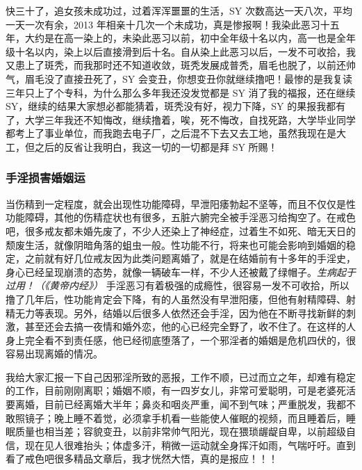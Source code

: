 \begin{case}[手淫损害爱情运]
    快三十了，追女孩未成功过，过着浑浑噩噩的生活，SY 次数高达一天八次，平均一天一次有余，2013 年相亲十几次一个未成功，真是惨报啊！我染此恶习十五年，大约是在高一染上的，未染此恶习以前，初中全年级十名以内，高一也是全年级十名以内，染上以后直接滑到后十名。自从染上此恶习以后，一发不可收拾，我又患上了斑秃，而我那时还不知道收敛，斑秃发展成普秃，眉毛也脱了，以前还帅气，眉毛没了直接丑死了，SY 会变丑，你想变丑你就继续撸吧！最惨的是我复读三年只上了个专科，为什么那么多年我还没发觉都是 SY 消了我的福报，还在继续 SY，继续的结果大家想必都能猜着，斑秃没有好，视力下降，SY 的果报我都有了，大学三年我还不知悔改，继续撸着，唉，死不悔改，自找死路，大学毕业同学都考上了事业单位，而我跑去电子厂，之后混不下去又去工地，虽然我现在是大工，但之后的反省让我明白，我这一切的一切都是拜 SY 所赐！
\end{case}

\subsubsection{手淫损害婚姻运}

当伤精到一定程度，就会出现性功能障碍，早泄阳痿勃起不坚等，而且不仅仅是性功能障碍，其他的伤精症状也有很多，五脏六腑完全被手淫恶习给掏空了。在戒色吧，很多戒友都未婚先废了，不少人还染上了神经症，过着生不如死、暗无天日的颓废生活，就像阴暗角落的蛆虫一般。性功能不行，将来也可能会影响到婚姻的稳定，之前就有好几位戒友因为此类问题离婚了，就是在结婚前有十多年的手淫史，身心已经呈现崩溃的态势，就像一辆破车一样，不少人还被戴了绿帽子。\textit{生病起于过用！（《黄帝内经》）} 手淫恶习有着极强的成瘾性，很容易一发不可收拾，所以撸了几年后，性功能肯定会下降，有的人虽然没有早泄阳痿，但他有射精障碍、射精无力等表现。另外，结婚以后很多人依然还会手淫，因为他在不断寻找新鲜的刺激，甚至还会去搞一夜情和婚外恋，他的心已经完全野了，收不住了。在这样的人身上完全看不到责任感，他已经彻底堕落了，一个邪淫者的婚姻是危机四伏的，很容易出现离婚的情况。

\begin{case}[手淫损害婚姻运]
    我给大家汇报一下自己因邪淫所致的恶报，工作不顺，已过而立之年，却难有稳定的工作，目前刚刚离职；婚姻不顺，有一四岁女儿，非常可爱聪明，可是老婆死活要离婚，目前已经离婚大半年；鼻炎和咽炎严重，闻不到气味；严重脱发，我都不敢照镜子；晚上睡不着觉，必须拿手机看一些能使人催眠的视频，而且睡着后，睡眠质量也相当差；容貌变丑，以前非常帅气阳光，现在猥琐龌龊自卑，以前超级自信，现在见人很难抬头；体虚多汗，稍微一运动就全身挥汗如雨，气喘吁吁。直到看了戒色吧很多精品文章后，我才恍然大悟，真的是报应！！！
\end{case}

